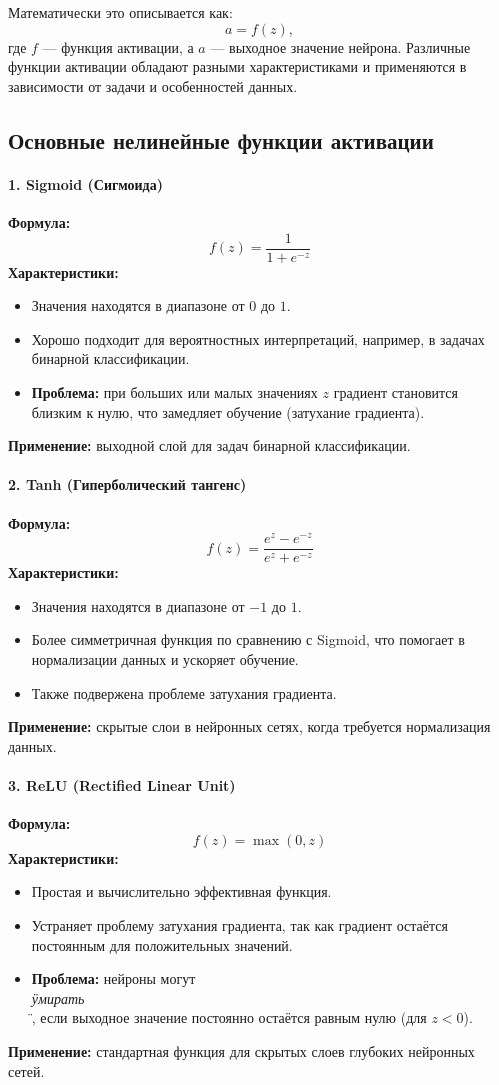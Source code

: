 {Математически это описывается как:
\[
    a = f(z),
\]
где $f$ — функция активации, а $a$ — выходное значение нейрона. Различные функции активации обладают разными характеристиками и применяются в зависимости от задачи и особенностей данных.

\subsection*{Основные нелинейные функции активации}

\paragraph{1. Sigmoid (Сигмоида)}
\textbf{Формула:}
\[
    f(z) = \frac{1}{1 + e^{-z}}
\]
\textbf{Характеристики:}
\begin{itemize}
    \item Значения находятся в диапазоне от $0$ до $1$.
    \item Хорошо подходит для вероятностных интерпретаций, например, в задачах бинарной классификации.
    \item \textbf{Проблема:} при больших или малых значениях $z$ градиент становится близким к нулю, что замедляет обучение (затухание градиента).
\end{itemize}
\textbf{Применение:} выходной слой для задач бинарной классификации.

\paragraph{2. Tanh (Гиперболический тангенс)}
\textbf{Формула:}
\[
    f(z) = \frac{e^z - e^{-z}}{e^z + e^{-z}}
\]
\textbf{Характеристики:}
\begin{itemize}
    \item Значения находятся в диапазоне от $-1$ до $1$.
    \item Более симметричная функция по сравнению с Sigmoid, что помогает в нормализации данных и ускоряет обучение.
    \item Также подвержена проблеме затухания градиента.
\end{itemize}
\textbf{Применение:} скрытые слои в нейронных сетях, когда требуется нормализация данных.

\paragraph{3. ReLU (Rectified Linear Unit)}
\textbf{Формула:}
\[
    f(z) = \max(0, z)
\]
\textbf{Характеристики:}
\begin{itemize}
    \item Простая и вычислительно эффективная функция.
    \item Устраняет проблему затухания градиента, так как градиент остаётся постоянным для положительных значений.
    \item \textbf{Проблема:} нейроны могут \textit{\\\"умирать\\\"}, если выходное значение постоянно остаётся равным нулю (для $z < 0$).
\end{itemize}
\textbf{Применение:} стандартная функция для скрытых слоев глубоких нейронных сетей.

}
